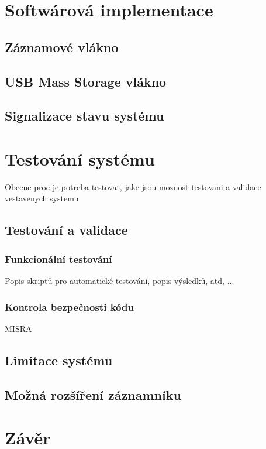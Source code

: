 \chapter{Softwárová implementace}

\section{Záznamové vlákno}

\section{USB Mass Storage vlákno}

\section{Signalizace stavu systému}

\chapter{Testování systému}
Obecne proc je potreba testovat, jake jsou moznost testovani a validace vestavenych systemu


\section{Testování a validace}

\subsection{Funkcionální testování}
Popis skriptů pro automatické testování, popis výsledků, atd, ...

\subsection{Kontrola bezpečnosti kódu}
MISRA


\section{Limitace systému}
\label{limitace}


\section{Možná rozšíření záznamníku}
\label{mozne_rozsireni}

\chapter{Závěr}
\label{zaverPrace}



%
